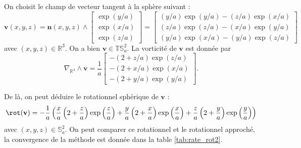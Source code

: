 On choisit le champ de vecteur tangent à la sphère suivant :
\begin{equation}
\mathbf{v}(x,y,z) = \mathbf{n}(x,y,z) \wedge \begin{bmatrix}
\exp (y/a) \\ \exp (x/a) \\ \exp (z/a)
\end{bmatrix} =
\begin{bmatrix}
(y/a) \exp (y/a) - (z/a) \exp (x/a)\\
(z/a) \exp (z/a) - (x/a) \exp (y/a)\\
(y/a) \exp (x/a) - (y/a) \exp (z/a)
\end{bmatrix} 
\label{eq:fun1_rot}
\end{equation}
avec $(x,y,z) \in \mathbb{R}^3$. On a bien $\mathbf{v} \in \mathbb{T}\mathbb{S}_a^2$.
La vorticité de $\mathbf{v}$ est donnée par
\begin{equation}
\nabla_{\mathbb{R}^3} \wedge \mathbf{v} = \dfrac{1}{a} \begin{bmatrix}
-(2+z/a) \exp (z/a)\\ -(2+x/a) \exp (x/a)\\ -(2+y/a) \exp (y/a)
\end{bmatrix}.
\end{equation}

De là, on peut déduire le rotationnel sphérique de $\mathbf{v}$ :
\begin{equation}
\rot ( \mathbf{v} ) = - \dfrac{1}{a} \left( \dfrac{x}{a} \left( 2 + \dfrac{z}{a}  \right) \exp \left( \dfrac{z}{a} \right) + \dfrac{y}{a} \left( 2 + \dfrac{x}{a}  \right) \exp \left( \dfrac{x}{a} \right) + \dfrac{z}{a} \left( 2 + \dfrac{y}{a}  \right) \exp \left( \dfrac{y}{a} \right) \right)
\end{equation}
avec $(x,y,z) \in \mathbb{S}_a^2$. On peut comparer ce rotationnel et le rotationnel approché, la convergence de la méthode est donnée dans la table \ref{tab:rate_rot2}.

